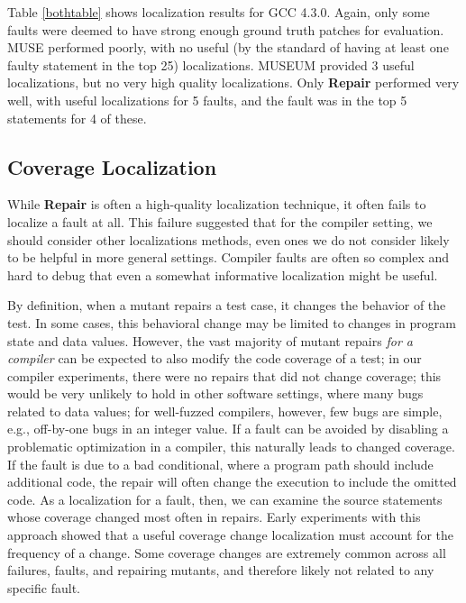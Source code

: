 Table \ref{bothtable} shows localization results for GCC 4.3.0.  Again, only some faults were deemed to have strong enough ground truth patches for evaluation.   MUSE performed poorly, with no useful (by the standard of having at least one faulty statement in the top 25) localizations.  MUSEUM provided 3 useful localizations, but no very high quality localizations.  Only {\bf Repair} performed very well, with useful localizations for 5 faults, and the fault was in the top 5 statements for 4 of these.

\subsection{Coverage Localization}
\label{sec:covloc}

While {\bf Repair} is often a high-quality localization technique, it often fails to localize a fault at all.  This failure suggested that for the compiler setting, we should consider other localizations methods, even ones we do not consider likely to be helpful in more general settings.  Compiler faults are often so complex and hard to debug that even a somewhat informative localization might be useful.

By definition, when a mutant repairs a test case, it changes the
behavior of the test.  In some cases, this behavioral change may be
limited to changes in program state and data values.  However, the
vast majority of mutant repairs \emph{for a compiler} can be expected to also modify the code coverage of a
test; in our compiler experiments, there were no repairs that did not change
coverage; this would be very unlikely to hold in other software settings, where many bugs related to data values; for well-fuzzed compilers, however, few bugs are simple, e.g., off-by-one bugs in an integer value.  If a fault can be avoided by disabling a
problematic optimization in a compiler, this naturally leads to
changed coverage.  If the fault is due to a bad conditional, where a
program path should include additional code, the repair will often
change the execution to include the omitted code.  As a localization
for a fault, then, we can examine the source statements whose
coverage changed most often in repairs.  Early experiments with this
 approach showed that a useful coverage change localization must  account for the frequency of a
change.  Some coverage changes are extremely common across all
failures, faults, and repairing mutants,
and therefore likely not related to any specific fault.

